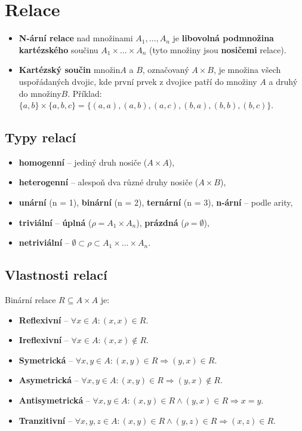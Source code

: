 \section{Relace}
\begin{itemize}
    \item \textbf{N-ární relace} nad množinami $A_1, \ldots, A_n$ je \textbf{libovolná podmnožina kartézského} součinu $A_1 \times \ldots \times A_n$ (tyto množiny jsou \textbf{nosičemi} relace).
    \item \textbf{Kartézský součin} množin$A$ a $ B $, označovaný $ A \times B $, je množina všech uspořádaných dvojic, kde první prvek z dvojice patří do množiny $ A $ a druhý do množiny$  B $. Příklad: $\{a, b\} \times \{a, b, c\} = \{(a, a), (a, b), (a, c), (b, a), (b, b), (b, c)\}$.
\end{itemize}
\subsection{Typy relací}
\begin{itemize}
    \item \textbf{homogenní} -- jediný druh nosiče ($A \times A$),
    \item \textbf{heterogenní} -- alespoň dva různé druhy nosiče ($A \times B$),
    \item \textbf{unární} (n = 1), \textbf{binární} (n = 2), \textbf{ternární} (n = 3), \textbf{n-ární} -- podle arity,
    \item \textbf{triviální} -- \textbf{úplná} ($\rho = A_1 \times A_n$), \textbf{prázdná} ($\rho = \emptyset$),
    \item \textbf{netriviální} -- $\emptyset \subset \rho \subset A_1 \times \ldots \times A_n$.
\end{itemize}

\subsection{Vlastnosti relací}
Binární relace $R \subseteq A \times A$ je:

\begin{itemize}
    \item \textbf{Reflexivní} -- $\forall x \in{} A: (x, x) \in{} R $.
    \item \textbf{Ireflexivní} -- $\forall x \in{} A: (x, x) \notin{}R $.
    \item \textbf{Symetrická} -- $\forall x, y \in{} A: (x, y) \in{}R \Rightarrow (y, x) \in{}R $.
    \item \textbf{Asymetrická} -- $\forall x, y \in{} A: (x, y) \in{}R \Rightarrow (y, x) \notin{}R $.
    \item \textbf{Antisymetrická} -- $\forall x, y \in{} A: (x, y) \in{}R \land (y, x) \in{}R \Rightarrow x = y$.
    \item \textbf{Tranzitivní} -- $\forall x, y, z \in{} A: (x, y) \in{}R \land (y, z) \in{}R \Rightarrow (x,z) \in R$.
\end{itemize}

